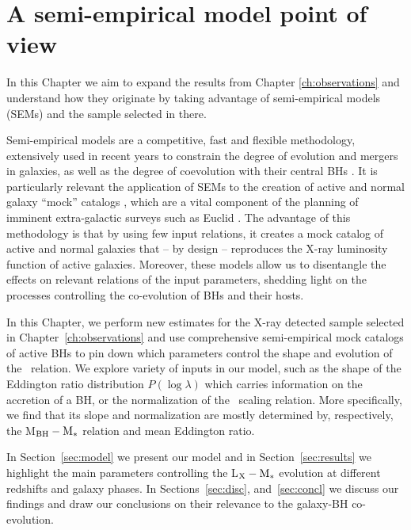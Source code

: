 \chapter{A semi-empirical model point of view} \label{ch:SEM}


In this Chapter we aim to expand the results from Chapter \ref{ch:observations} and understand how they originate by taking advantage of semi-empirical models (SEMs) and the sample selected in there.

Semi-empirical models are a competitive, fast and flexible methodology, extensively used in recent years to constrain the degree of evolution and mergers in galaxies, as well as the degree of coevolution with their central BHs \citep{2013ApJ...762...70C, 2019MNRAS.487..275G, 2019MNRAS.487.2005C, 2020arXiv201002957A, ShankarNat, Allevato21}. 
It is particularly relevant the application of SEMs to the creation of active and normal galaxy ``mock'' catalogs \citep[e.g.][]{2019MNRAS.487..275G, 2019MNRAS.487.2005C, 2020arXiv201002957A, ShankarNat, Allevato21},
which are a vital component of the planning of imminent
extra-galactic surveys such as Euclid \citep[][]{laureijs11}.
The advantage of this methodology is that by using few input relations, 
it creates a mock catalog of active and normal galaxies that – by design – reproduces 
the X-ray luminosity function of active galaxies. 
Moreover, these models allow us to disentangle the effects on 
relevant relations of the input parameters,
shedding light on the processes controlling the co-evolution of BHs and their hosts.

In this Chapter, we perform new estimates for the X-ray detected sample selected in Chapter~\ref{ch:observations} and use comprehensive semi-empirical mock 
catalogs of active BHs 
to pin down which parameters control the shape and evolution of the \LXMS\ relation. We explore variety of inputs in our model, such as the shape of the Eddington ratio distribution $P(\log\lambda)$ which carries information on the accretion of a BH, or the normalization of the \MBHMS\ scaling relation. More specifically, we find that its slope and normalization are mostly determined by, respectively, the M$_{\rm BH}-{\rm M}_*$ relation and mean Eddington ratio.

In Section~\ref{sec:model} we present our model and in Section~\ref{sec:results} we highlight the main parameters controlling the L$_{\rm X}-{\rm M}_*$ evolution at different redshifts and galaxy phases.
In Sections~\ref{sec:disc}, and~\ref{sec:concl} we discuss our findings and draw our conclusions on their relevance to the galaxy-BH co-evolution.

